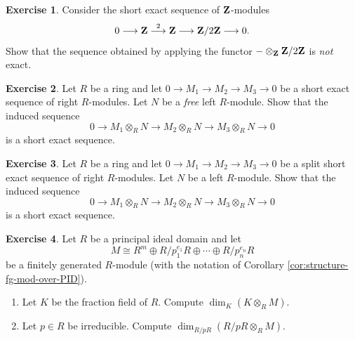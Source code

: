 \documentclass[11pt]{amsbook}
\newcommand{\longto}{\longrightarrow}
\theoremstyle{plain}
\theoremstyle{definition}
\newtheorem{exercise}{Exercise}
\begin{document}
\begin{exercise}\label{exc:tensor-not-exact}
Consider the short exact sequence of ${\mathbf{Z}}$-modules
\[
	0 \longto \bZ \overset{2}{\longto} \bZ \longto \bZ/2\bZ \longto 0.
\]
Show that the sequence obtained by applying the functor $-\otimes_{\mathbf{Z}} {\mathbf{Z}}/2{\mathbf{Z}}$ is \emph{not} exact.
\end{exercise}



\begin{exercise}\label{exc:tensor-with-free-is-exact}
Let $R$ be a ring and let $0\to M_1\to M_2 \to M_3\to 0$ be a short exact sequence of right $R$-modules. Let $N$ be a \emph{free} left $R$-module. Show that the induced sequence
\[
	0 \to M_1\otimes_R N \to M_2 \otimes_R N \to M_3 \otimes_R N \to 0
\]
is a short exact sequence.
\end{exercise}


\begin{exercise}
Let $R$ be a ring and let $0\to M_1\to M_2 \to M_3\to 0$ be a split short exact sequence of right $R$-modules. Let $N$ be a left $R$-module. Show that the induced sequence
\[
	0 \to M_1\otimes_R N \to M_2 \otimes_R N \to M_3 \otimes_R N \to 0
\]
is a short exact sequence.
\end{exercise}

\begin{exercise}Let $R$ be a principal ideal domain and let
\[
	M \cong R^m \oplus R/p_1^{e_1}R \oplus \cdots \oplus R/p_n^{e_n}R
\]
 be a finitely generated $R$-module (with the notation of Corollary \ref{cor:structure-fg-mod-over-PID}). 
 \begin{enumerate}
 \item Let $K$ be the fraction field of $R$. Compute $\dim_K(K\otimes_R M)$.
 \item Let $p\in R$ be irreducible. Compute $\dim_{R/pR}(R/pR \otimes_R M)$.
 \end{enumerate}
\end{exercise}
\end{document}

